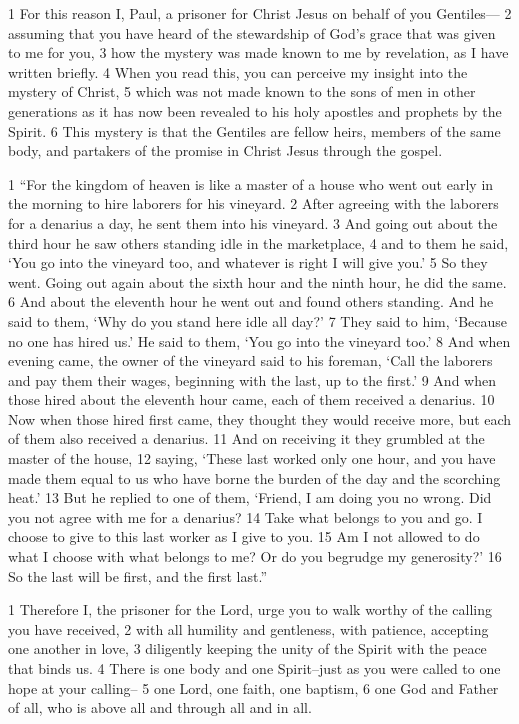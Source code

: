 \begin{bible}
1 For this reason I, Paul, a prisoner for Christ Jesus on behalf of you Gentiles— 2 assuming that you have heard of the stewardship of God's grace that was given to me for you, 3 how the mystery was made known to me by revelation, as I have written briefly. 4 When you read this, you can perceive my insight into the mystery of Christ, 5 which was not made known to the sons of men in other generations as it has now been revealed to his holy apostles and prophets by the Spirit. 6 This mystery is that the Gentiles are fellow heirs, members of the same body, and partakers of the promise in Christ Jesus through the gospel.


1 ``For the kingdom of heaven is like a master of a house who went out early in the morning to hire laborers for his vineyard. 2 After agreeing with the laborers for a denarius a day, he sent them into his vineyard. 3 And going out about the third hour he saw others standing idle in the marketplace, 4 and to them he said, ‘You go into the vineyard too, and whatever is right I will give you.’ 5 So they went. Going out again about the sixth hour and the ninth hour, he did the same. 6 And about the eleventh hour he went out and found others standing. And he said to them, ‘Why do you stand here idle all day?’ 7 They said to him, ‘Because no one has hired us.’ He said to them, ‘You go into the vineyard too.’ 8 And when evening came, the owner of the vineyard said to his foreman, ‘Call the laborers and pay them their wages, beginning with the last, up to the first.’ 9 And when those hired about the eleventh hour came, each of them received a denarius. 10 Now when those hired first came, they thought they would receive more, but each of them also received a denarius. 11 And on receiving it they grumbled at the master of the house, 12 saying, ‘These last worked only one hour, and you have made them equal to us who have borne the burden of the day and the scorching heat.’ 13 But he replied to one of them, ‘Friend, I am doing you no wrong. Did you not agree with me for a denarius? 14 Take what belongs to you and go. I choose to give to this last worker as I give to you. 15 Am I not allowed to do what I choose with what belongs to me? Or do you begrudge my generosity?’ 16 So the last will be first, and the first last.''

1 Therefore I, the prisoner for the Lord, urge you to walk worthy of the calling you have received, 2 with all humility and gentleness, with patience, accepting one another in love, 3 diligently keeping the unity of the Spirit with the peace that binds us. 4 There is one body and one Spirit--just as you were called to one hope at your calling-- 5 one Lord, one faith, one baptism, 6 one God and Father of all, who is above all and through all and in all.


\end{bible}
